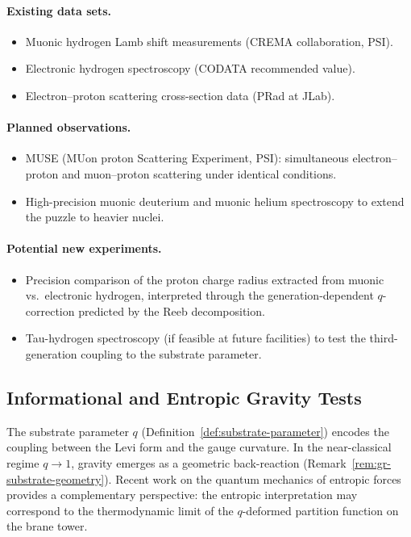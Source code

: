 \paragraph{Existing data sets.}
\begin{itemize}
  \item Muonic hydrogen Lamb shift measurements (CREMA collaboration, PSI).
  \item Electronic hydrogen spectroscopy (CODATA recommended value).
  \item Electron--proton scattering cross-section data (PRad at JLab).
\end{itemize}

\paragraph{Planned observations.}
\begin{itemize}
  \item MUSE (MUon proton Scattering Experiment, PSI): simultaneous
        electron--proton and muon--proton scattering under identical
        conditions.
  \item High-precision muonic deuterium and muonic helium spectroscopy
        to extend the puzzle to heavier nuclei.
\end{itemize}

\paragraph{Potential new experiments.}
\begin{itemize}
  \item Precision comparison of the proton charge radius extracted from
        muonic vs.\ electronic hydrogen, interpreted through the
        generation-dependent $q$-correction predicted by the Reeb
        decomposition.
  \item Tau-hydrogen spectroscopy (if feasible at future facilities) to
        test the third-generation coupling to the substrate parameter.
\end{itemize}

\subsection{Informational and Entropic Gravity Tests}
\label{sec:entropic-gravity}

\begin{remark}
\label{rem:entropic-gravity}
The substrate parameter $q$ (Definition~\ref{def:substrate-parameter}) encodes
the coupling between the Levi form and the gauge curvature.  In the
near-classical regime $q \to 1$, gravity emerges as a geometric back-reaction
(Remark~\ref{rem:gr-substrate-geometry}).  Recent work on the quantum mechanics
of entropic forces~\cite{carney2025} provides a complementary perspective: the
entropic interpretation may correspond to the thermodynamic limit of the
$q$-deformed partition function on the brane tower.
\end{remark}

